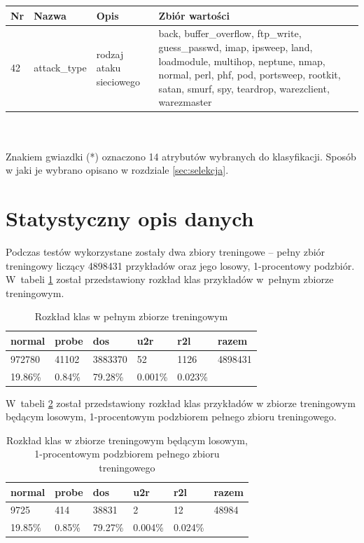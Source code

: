 \documentclass[a4paper, 12pt]{article}
\begin{document}
\begin{tabular}{ | l | l | p{} | p{} | } \hline
Nr & Nazwa & Opis & Zbiór wartości \\ \hline
42      & attack\_type & rodzaj ataku sieciowego & back, buffer\_overflow, ftp\_write, guess\_passwd, imap, ipsweep, land, loadmodule, multihop, neptune, nmap, normal, perl, phf, pod, portsweep, rootkit, satan, smurf, spy, teardrop, warezclient, warezmaster \\ \hline
\end{tabular} \\\\

Znakiem gwiazdki (*) oznaczono 14 atrybutów wybranych do klasyfikacji.
Sposób w jaki je wybrano opisano w rozdziale \ref{sec:selekcja}.

\section{Statystyczny opis danych}

Podczas testów wykorzystane zostały dwa zbiory treningowe -- pełny zbiór treningowy 
liczący 4898431 przykładów oraz jego losowy, 1-procentowy podzbiór.
W~tabeli \ref{table:100percent} został przedstawiony rozkład klas przykładów w~pełnym zbiorze
treningowym. 

\begin{table}[H]
\centering
\begin{tabular}{ | l | l | l | l | l | l | } \hline
	normal & probe & dos & u2r & r2l & razem \\  \hline
	972780 & 41102 & 3883370 & 52 & 1126 & 4898431 \\ \hline
	19.86\% & 0.84\% & 79.28\% & 0.001\% & 0.023\% & \\ \hline
\end{tabular}
\caption{Rozkład klas w pełnym zbiorze treningowym}
\label{table:100percent}
\end{table}

W~tabeli \ref{table:1percent} został przedstawiony rozkład klas przykładów w 
zbiorze treningowym będącym losowym, 1-procentowym
podzbiorem pełnego zbioru treningowego.
\begin{table}[H]
\centering
\begin{tabular}{ | l | l | l | l | l | l | } \hline
	normal & probe & dos & u2r & r2l & razem \\ \hline
	9725 & 414 & 38831 & 2 & 12 & 48984 \\ \hline
	19.85\%  & 0.85\%  & 79.27\% & 0.004\%  & 0.024\% &  \\ \hline
\end{tabular}
\caption{Rozkład klas w zbiorze treningowym będącym losowym, 1-procentowym
 podzbiorem pełnego zbioru treningowego}
\label{table:1percent}
\end{table}
\end{document}
